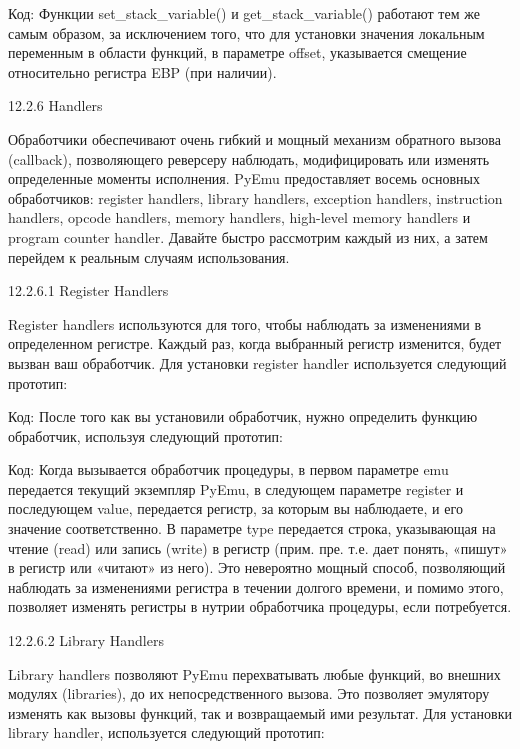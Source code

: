 \documentclass[12pt]{book}
\begin{document}
Код:
Функции set\_stack\_variable() и get\_stack\_variable() работают тем же самым образом, за исключением того, что для установки значения локальным переменным в области функций, в параметре offset, указывается смещение относительно регистра EBP (при наличии).

12.2.6 Handlers

Обработчики обеспечивают очень гибкий и мощный механизм обратного вызова (callback), позволяющего реверсеру наблюдать, модифицировать или изменять определенные моменты исполнения. PyEmu предоставляет восемь основных обработчиков: register handlers, library handlers, exception handlers, instruction handlers, opcode handlers, memory handlers, high-level memory handlers и program counter handler. Давайте быстро рассмотрим каждый из них, а затем перейдем к реальным случаям использования.

12.2.6.1 Register Handlers

Register handlers используются для того, чтобы наблюдать за изменениями в определенном регистре. Каждый раз, когда выбранный регистр изменится, будет вызван ваш обработчик. Для установки register handler используется следующий прототип:

Код:
После того как вы установили обработчик, нужно определить функцию обработчик, используя следующий прототип:

Код:
Когда вызывается обработчик процедуры, в первом параметре emu передается текущий экземпляр PyEmu, в следующем параметре register и последующем value, передается регистр, за которым вы наблюдаете, и его значение соответственно. В параметре type передается строка, указывающая на чтение (read) или запись (write) в регистр (прим. пре. т.е. дает понять, «пишут» в регистр или «читают» из него). Это невероятно мощный способ, позволяющий наблюдать за изменениями регистра в течении долгого времени, и помимо этого, позволяет изменять регистры в нутрии обработчика процедуры, если потребуется.

12.2.6.2 Library Handlers

Library handlers позволяют PyEmu перехватывать любые функций, во внешних модулях (libraries), до их непосредственного вызова. Это позволяет эмулятору изменять как вызовы функций, так и возвращаемый ими результат. Для установки library handler, используется следующий прототип:
\end{document}
